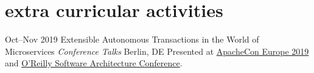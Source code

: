 \section{\normalfont extra curricular activities}
\begin{entrylist}


\entry
{Oct--Nov 2019}
{Extensible Autonomous Transactions in the World of Microservices {\normalfont \emph{Conference Talks}}}
{Berlin, DE}
{Presented at \href{https://aceu19.apachecon.com/session/extensible-autonomous-transactions-world-microservices-using-apache-kafka}{ApacheCon Europe 2019} and \href{https://conferences.oreilly.com/software-architecture/sa-eu/public/schedule/detail/78661}{O'Reilly Software Architecture Conference}.}



\end{entrylist}